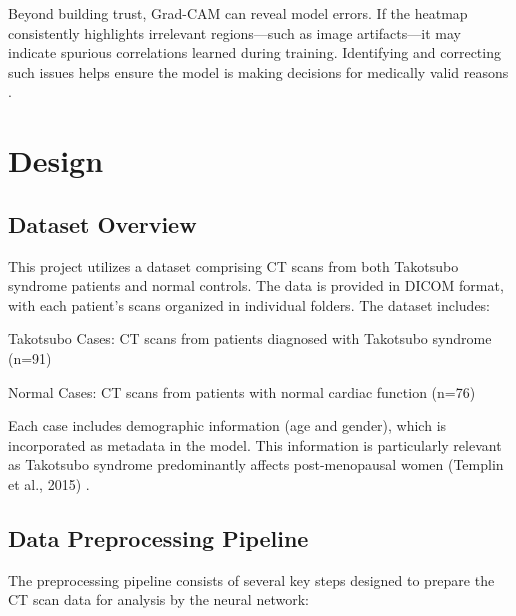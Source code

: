 \documentclass[12pt, BSc]{muthesis}
\begin{document}
Beyond building trust, Grad-CAM can reveal model errors. If the heatmap consistently highlights irrelevant regions—such as image artifacts—it may indicate spurious correlations learned during training. Identifying and correcting such issues helps ensure the model is making decisions for medically valid reasons \cite{arun2021assessing}.


\chapter{Design}
\section{Dataset Overview}
This project utilizes a dataset comprising CT scans from both Takotsubo syndrome patients and normal controls. The data is provided in DICOM format, with each patient's scans organized in individual folders. The dataset includes:

Takotsubo Cases: CT scans from patients diagnosed with Takotsubo syndrome (n=91)

Normal Cases: CT scans from patients with normal cardiac function (n=76)

Each case includes demographic information (age and gender), which is incorporated as metadata in the model. This information is particularly relevant as Takotsubo syndrome predominantly affects post-menopausal women (Templin et al., 2015) \cite{TODO}.

\section{Data Preprocessing Pipeline}
The preprocessing pipeline consists of several key steps designed to prepare the CT scan data for analysis by the neural network:
\end{document}

